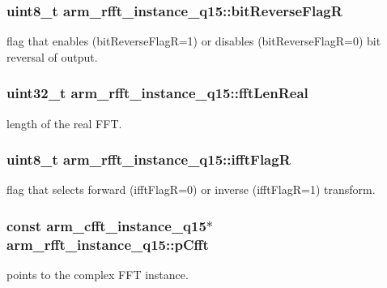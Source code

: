 \subsubsection[{\texorpdfstring{bit\+Reverse\+FlagR}{bitReverseFlagR}}]{\setlength{\rightskip}{0pt plus 5cm}uint8\+\_\+t arm\+\_\+rfft\+\_\+instance\+\_\+q15\+::bit\+Reverse\+FlagR}\hypertarget{structarm__rfft__instance__q15_a4c65cd40e0098ec2f5c0dc31488b9bc6}{}\label{structarm__rfft__instance__q15_a4c65cd40e0098ec2f5c0dc31488b9bc6}
flag that enables (bit\+Reverse\+FlagR=1) or disables (bit\+Reverse\+FlagR=0) bit reversal of output. 
\subsubsection[{\texorpdfstring{fft\+Len\+Real}{fftLenReal}}]{\setlength{\rightskip}{0pt plus 5cm}uint32\+\_\+t arm\+\_\+rfft\+\_\+instance\+\_\+q15\+::fft\+Len\+Real}\hypertarget{structarm__rfft__instance__q15_aac5cf9e825917cbb14f439e56bb86ab3}{}\label{structarm__rfft__instance__q15_aac5cf9e825917cbb14f439e56bb86ab3}
length of the real F\+FT. 
\subsubsection[{\texorpdfstring{ifft\+FlagR}{ifftFlagR}}]{\setlength{\rightskip}{0pt plus 5cm}uint8\+\_\+t arm\+\_\+rfft\+\_\+instance\+\_\+q15\+::ifft\+FlagR}\hypertarget{structarm__rfft__instance__q15_a8051ffe268c147e431e1bea7bb4c4258}{}\label{structarm__rfft__instance__q15_a8051ffe268c147e431e1bea7bb4c4258}
flag that selects forward (ifft\+FlagR=0) or inverse (ifft\+FlagR=1) transform. 
\subsubsection[{\texorpdfstring{p\+Cfft}{pCfft}}]{\setlength{\rightskip}{0pt plus 5cm}const {\bf arm\+\_\+cfft\+\_\+instance\+\_\+q15}$\ast$ arm\+\_\+rfft\+\_\+instance\+\_\+q15\+::p\+Cfft}\hypertarget{structarm__rfft__instance__q15_a4329c15b056444746d37ff082a24d31a}{}\label{structarm__rfft__instance__q15_a4329c15b056444746d37ff082a24d31a}
points to the complex F\+FT instance. 
